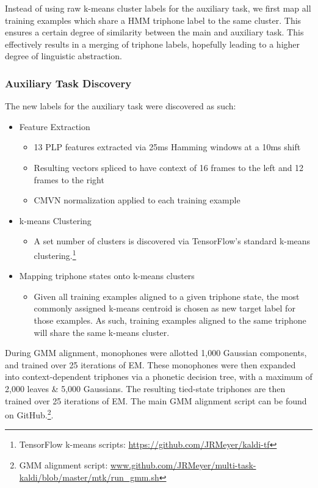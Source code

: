 \documentclass[a4paper]{article}
\begin{document}
Instead of using raw k-means cluster labels for the auxiliary task, we first map all training examples which share a HMM triphone label to the same cluster. This ensures a certain degree of similarity between the main and auxiliary task. This effectively results in a merging of triphone labels, hopefully leading to a higher degree of linguistic abstraction.


\subsubsection{Auxiliary Task Discovery}

The new labels for the auxiliary task were discovered as such:

\begin{itemize}
\item Feature Extraction
  \begin{itemize}
  \item 13 PLP features extracted via 25ms Hamming windows at a 10ms shift
  \item Resulting vectors spliced to have context of 16 frames to the left and 12 frames to the right
  \item CMVN normalization applied to each training example
  \end{itemize}

\item k-means Clustering
  \begin{itemize}
  \item A set number of clusters is discovered via TensorFlow's standard k-means clustering.\footnote{TensorFlow k-means scripts: \url{https://github.com/JRMeyer/kaldi-tf}}

  \end{itemize}

\item Mapping triphone states onto k-means clusters
   \begin{itemize}
   \item Given all training examples aligned to a given triphone state, the most commonly assigned k-means centroid is chosen as new target label for those examples. As such, training examples aligned to the same triphone will share the same k-means cluster.
     
  \end{itemize} 
\end{itemize}

During GMM alignment, monophones were allotted 1,000 Gaussian components, and trained over 25 iterations of EM. These monophones were then expanded into context-dependent triphones via a phonetic decision tree, with a maximum of 2,000 leaves \& 5,000 Gaussians. The resulting tied-state triphones are then trained over 25 iterations of EM. The main GMM alignment script can be found on GitHub.\footnote{GMM alignment script: \url{www.github.com/JRMeyer/multi-task-kaldi/blob/master/mtk/run_gmm.sh}}.
\end{document}
